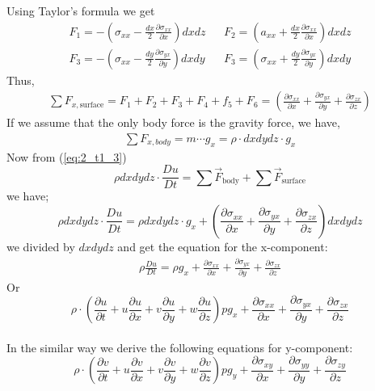 \documentclass[11pt]{report}
\newcommand{\sps}{\\[0.2cm]}
\newcommand{\refn}[1]{(\ref{#1})}
\newcommand{\refx}[1]{\refn{eq:#1}}
\newcommand{\NI}{\noindent}
\begin{document}
	Using Taylor's formula we get
	\begin{eqnarray*}
		F_1 = -\left(\sigma_{xx} - \frac{dx}{2}\frac{\partial \sigma_{xx}}{\partial x}\right)dxdz && F_2 = \left(a_{xx}+\frac{dx}{2}\frac{\partial\sigma_{xx}}{\partial x}\right)dxdz\sps
		F_3 = - \left(\sigma_{xx} - \frac{dy}{2}\frac{\partial\sigma_{yx}}{\partial y}\right)dxdy && 	F_3 = \left(\sigma_{xx} + \frac{dy}{2}\frac{\partial\sigma_{yx}}{\partial y}\right)dxdy
	\end{eqnarray*}
	Thus,
	\begin{eqnarray*}
		\sum F_{x,\text{surface}} = F_1 + F_2 + F_3 + F_4 + f_5 + F_6 = \left(\frac{\partial \sigma_{xx}}{\partial x} + \frac{\partial \sigma_{yx}}{\partial y} + \frac{\partial \sigma_{zx}}{\partial z}\right)
	\end{eqnarray*}
	If we assume that the only body force is the gravity force, we have,
	\begin{eqnarray}
		\sum F_{x,body} = m \cdots g_x = \rho \cdot dxdydz \cdot g_x
	\end{eqnarray}
	Now from \refx{2_t1_3}
	\begin{equation}
			\rho dx dy dz \cdot \frac{Du}{Dt} = \sum \vec{F}_{\text{body}} + \sum \vec{F}_{\text{surface}}\tag{3}\label{eq:2_t1_3a}
	\end{equation}
	we have;
	\begin{equation*}
			\rho dx dy dz \cdot \frac{Du}{Dt} =  \rho dx dy dz \cdot g_x + \left(\frac{\partial \sigma_{xx}}{\partial x} + \frac{\partial \sigma_{yx}}{\partial y} + \frac{\partial \sigma_{zx}}{\partial z}\right)dxdydz
	\end{equation*}
	we divided by $dxdydz$ and get the equation for the x-component:
	\begin{eqnarray*}
		\rho\frac{Du}{Dt} = \rho g_x + \frac{\partial \sigma_{xx}}{\partial x} + \frac{\partial \sigma_{yx}}{\partial y} + \frac{\partial \sigma_{zx}}{\partial z}
	\end{eqnarray*}
	Or
	\begin{equation}
		\rho \cdot \left(\frac{\partial u}{\partial t} + u\frac{\partial u}{\partial x} + v\frac{\partial u}{\partial y} + w\frac{\partial u}{\partial z}\right) pg_x +  \frac{\partial \sigma_{xx}}{\partial x} + \frac{\partial \sigma_{yx}}{\partial y} + \frac{\partial \sigma_{zx}}{\partial z} \tag{x} \label{eq:2_t1_x}
	\end{equation}
	{~}\\
	\NI In the similar way we derive the following equations for y-component:
	\begin{equation}
		\rho \cdot \left(\frac{\partial v}{\partial t} + u\frac{\partial v}{\partial x} + v\frac{\partial v}{\partial y} + w\frac{\partial v}{\partial z}\right) pg_y +  \frac{\partial \sigma_{xy}}{\partial x} + \frac{\partial \sigma_{yy}}{\partial y} + \frac{\partial \sigma_{zy}}{\partial z}\tag{y} \label{eq:2_t1_y}
	\end{equation}
\end{document}
